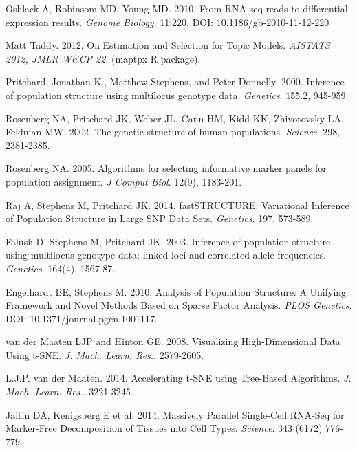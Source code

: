 \documentclass[10pt,letterpaper]{article}
\begin{document}
\begin{thebibliography}{9}
Oshlack A, Robinsom MD, Young MD. 2010.
From RNA-seq reads to differential expression results.
\textit{Genome Biology}. 11:220, DOI: 10.1186/gb-2010-11-12-220

Matt Taddy. 2012.
On Estimation and Selection for Topic Models.
\textit{AISTATS 2012, JMLR W\&CP 22}.
(maptpx R package).

Pritchard, Jonathan K., Matthew Stephens, and Peter Donnelly. 2000.
Inference of population structure using multilocus genotype data.
\textit{Genetics}. 155.2,  945-959.

Rosenberg NA, Pritchard JK,  Weber JL, Cann HM,  Kidd KK,  Zhivotovsky LA,  Feldman MW. 2002.
The genetic structure of human populations.
\textit{Science}. 298,  2381-2385.

Rosenberg NA. 2005.
Algorithms for selecting informative marker panels for population assignment.
\textit{J Comput Biol}. 12(9), 1183-201.

Raj A,  Stephens M,  Pritchard JK.  2014.
fastSTRUCTURE: Variational Inference of Population Structure in Large SNP Data Sets.
\textit{Genetics}. 197,  573-589.

Falush D,  Stephens M,  Pritchard JK. 2003.
Inference of population structure using multilocus genotype data: linked loci and correlated allele frequencies.
\textit{Genetics}. 164(4), 1567-87.

Engelhardt BE,  Stephens M. 2010.
Analysis of Population Structure: A Unifying Framework and Novel Methods Based on Sparse Factor Analysis.
\textit{PLOS Genetics}. DOI: 10.1371/journal.pgen.1001117.

van der Maaten LJP and  Hinton GE. 2008.
Visualizing High-Dimensional Data Using t-SNE.
\textit{J. Mach. Learn. Res.}.  2579-2605.

L.J.P. van der Maaten. 2014.
Accelerating t-SNE using Tree-Based Algorithms.
\textit{J. Mach. Learn. Res.}.  3221-3245.



Jaitin DA,  Kenigsberg E et al. 2014.
Massively Parallel Single-Cell RNA-Seq for Marker-Free Decomposition of Tissues into Cell Types.
\textit{Science}. 343 (6172) 776-779.


\end{thebibliography}
\end{document}
